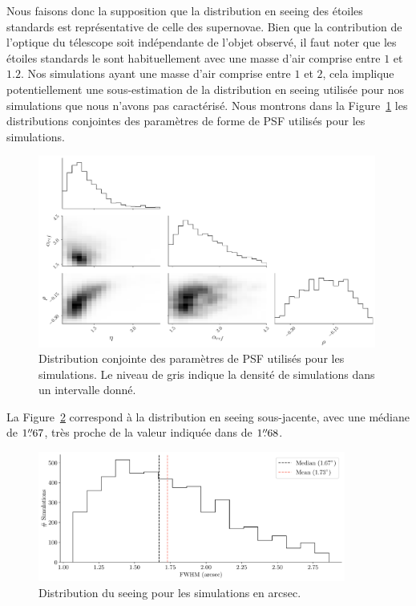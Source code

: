 \documentclass[../main/main.tex]{subfiles}
\begin{document}
Nous faisons donc la supposition que la distribution en seeing des
étoiles standards est représentative de celle des supernovae. Bien que
la contribution de l'optique du télescope soit indépendante
de l'objet observé, il faut noter que les étoiles standards le sont
habituellement avec une masse d'air comprise entre $1$ et
$1.2$. Nos simulations ayant une masse d'air comprise entre $1$ et $2$, cela implique potentiellement une sous-estimation de la
distribution en seeing utilisée pour nos simulations que nous
n'avons pas caractérisé. Nous montrons dans la
Figure~\ref{fig:psfparams} les distributions conjointes des paramètres
de forme de PSF utilisés pour les simulations. 

\begin{figure}[ht]
  \centering
  \includegraphics[width=0.99\textwidth]{../figures/08_simu/simupsfparams_corner.pdf}
  \caption[Distribution conjointe des paramètres de PSF des
  simulations.]{Distribution conjointe des paramètres de PSF utilisés
    pour les simulations. Le niveau de gris indique la densité de simulations
  dans un intervalle donné.}
\label{fig:psfparams}
\end{figure}

La Figure~\ref{fig:simufwhm} correspond à la distribution en seeing
sous-jacente, avec une médiane de $1\overset{\prime\prime}{.}67$, très proche de la valeur
indiquée dans \citet{SEDM18} de $1\overset{\prime\prime}{.}68$.

\begin{figure}[ht]
  \centering
  \includegraphics[width=0.9\textwidth]{../figures/08_simu/simupsf_fwhm.pdf}
  \caption[Distribution du seeing des simulations.]{Distribution
    du seeing pour les simulations en arcsec.}
\label{fig:simufwhm}
\end{figure}
\end{document}
